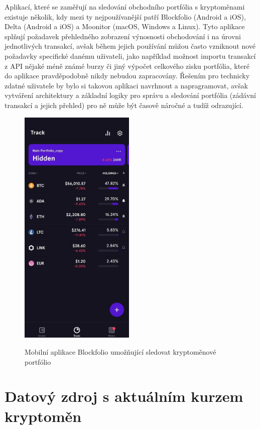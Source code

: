 \documentclass[12pt, a4paper]{article}
\let\oldsection\section
\renewcommand\section{\clearpage\oldsection}
\begin{document}
Aplikací, které se zaměřují na sledování obchodního portfólia s kryptoměnami existuje několik, kdy mezi ty nejpoužívanější patří Blockfolio\cite{blockfolio2021} (Android a iOS), Delta\cite{delta2021} (Android a iOS) a Moonitor\cite{moonitor2021} (macOS, Windows a Linux). Tyto aplikace splňují požadavek přehledného zobrazení výnosnosti obchodování i na úrovni jednotlivých transakcí, avšak během jejich používání můžou často vzniknout nové požadavky specifické danému uživateli, jako například možnost importu transakcí z API nějaké méně známé burzy či jiný výpočet celkového zisku portfólia, které do aplikace pravděpodobně nikdy nebudou zapracovány. Řešením pro technicky zdatné uživatele by bylo si takovou aplikaci navrhnout a napragramovat, avšak vytváření architektury a základní logiky pro správu a sledování portfólia (zádávní transakcí a jejich přehled) pro ně může být časově náročné a tudíž odrazující. 

\begin{figure}[!ht]
\centering
{\includegraphics[width=5.5cm]{img/blockfolio.png}}
\caption{Mobilní aplikace Blockfolio umožňující sledovat kryptoměnové portfólio}
\label{fig:simple-vrp-czech}
\end{figure}

\section{Datový zdroj s aktuálním kurzem kryptoměn}
\end{document}

